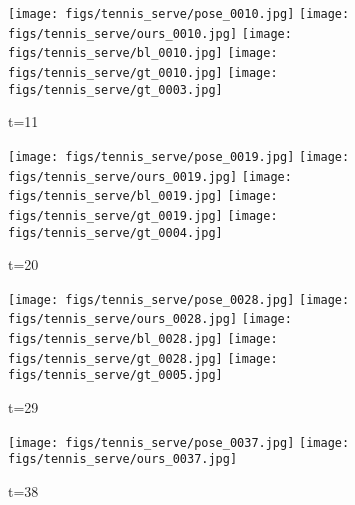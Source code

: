 \documentclass{article}
\begin{document}
\begin{figure*}[thbp]%
    \vspace{-6pt}
    \centering
	\begin{subfigure}{0.04\linewidth}
        \raggedleft
    \end{subfigure}
    \begin{subfigure}{0.12\linewidth}
        \caption*{t=11}
        \vspace{-7pt}
	    \texttt{[image: figs/tennis\_serve/pose\_0010.jpg]} 
  		\texttt{[image: figs/tennis\_serve/ours\_0010.jpg]}
  		\texttt{[image: figs/tennis\_serve/bl\_0010.jpg]}
  		\texttt{[image: figs/tennis\_serve/gt\_0010.jpg]}
  		\texttt{[image: figs/tennis\_serve/gt\_0003.jpg]}
	\end{subfigure} 
    \begin{subfigure}{0.12\linewidth}
        \caption*{t=20}
        \vspace{-7pt}
	    \texttt{[image: figs/tennis\_serve/pose\_0019.jpg]} 
  		\texttt{[image: figs/tennis\_serve/ours\_0019.jpg]}
  		\texttt{[image: figs/tennis\_serve/bl\_0019.jpg]}
  		\texttt{[image: figs/tennis\_serve/gt\_0019.jpg]}
  		\texttt{[image: figs/tennis\_serve/gt\_0004.jpg]}
	\end{subfigure} 
    \begin{subfigure}{0.12\linewidth}
        \caption*{t=29}
        \vspace{-7pt}
	    \texttt{[image: figs/tennis\_serve/pose\_0028.jpg]} 
  		\texttt{[image: figs/tennis\_serve/ours\_0028.jpg]}
  		\texttt{[image: figs/tennis\_serve/bl\_0028.jpg]}
  		\texttt{[image: figs/tennis\_serve/gt\_0028.jpg]}
  		\texttt{[image: figs/tennis\_serve/gt\_0005.jpg]}
	\end{subfigure} 
    \begin{subfigure}{0.12\linewidth}
        \caption*{t=38}
        \vspace{-7pt}
	    \texttt{[image: figs/tennis\_serve/pose\_0037.jpg]} 
  		\texttt{[image: figs/tennis\_serve/ours\_0037.jpg]}

\end{subfigure}
\end{figure*}
\end{document}
